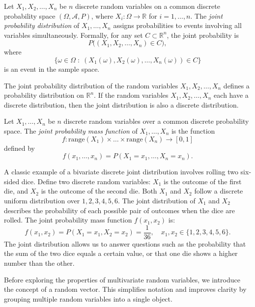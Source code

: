 \begin{definition}
Let $X_1, X_2, \ldots, X_n$ be $n$ discrete random variables on a common discrete probability space $(\Omega,\mathcal{A},P)$, where $X_i : \Omega \rightarrow \mathbb{R}$ for $i = 1, \ldots, n$. The \emph{joint probability distribution} of $X_1, \ldots, X_n$ assigns probabilities to events involving all variables simultaneously. Formally, for any set $C \subset \mathbb{R}^n$, the joint probability is
\[
P\big( (X_1, X_2, \ldots, X_n) \in C \big),
\]
where
\[
\{\omega \in \Omega \;:\; (X_1(\omega), X_2(\omega), \ldots, X_n(\omega)) \in C \}
\]
is an event in the sample space.
\end{definition}

The joint probability distribution of the random variables $X_1, X_2, \ldots, X_n$ defines a probability distribution on $\mathbb{R}^n$. If the random variables $X_1, X_2, \ldots, X_n$ each have a discrete distribution, then the joint distribution is also a discrete distribution.

\begin{definition}
Let $X_1, \ldots, X_n$ be $n$ discrete random variables over a common discrete probability space. The \emph{joint probability mass function} of $X_1, \ldots, X_n$ is the function
\[
f : \mathrm{range}(X_1) \times \ldots \times \mathrm{range}(X_n) \rightarrow [0, 1]
\]
defined by
\[
f \left( x_1, \ldots, x_n \right) = P \left( X_1 = x_1, \ldots, X_n = x_n \right).
\]
\end{definition}

\begin{example}
A classic example of a bivariate discrete joint distribution involves rolling two six-sided dice. Define two discrete random variables: $X_1$ is the outcome of the first die, and $X_2$ is the outcome of the second die. Both $X_1$ and $X_2$ follow a discrete uniform distribution over ${1, 2, 3, 4, 5, 6}$. The joint distribution of $X_1$ and $X_2$ describes the probability of each possible pair of outcomes when the dice are rolled. The joint probability mass function $f(x_1, x_2)$ is:
\[
f(x_1, x_2) = P(X_1 = x_1, X_2 = x_2) = \frac{1}{36}, \quad x_1, x_2 \in \{1, 2, 3, 4, 5, 6\}.
\]
The joint distribution allows us to answer questions such as the probability that the sum of the two dice equals a certain value, or that one die shows a higher number than the other.
\end{example}

Before exploring the properties of multivariate random variables, we introduce the concept of a random vector. This simplifies notation and improves clarity by grouping multiple random variables into a single object.

